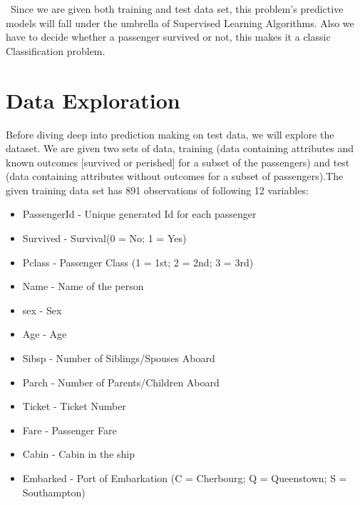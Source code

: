 \documentclass[a4paper,10pt]{report}\usepackage[]{graphicx}\usepackage[]{color}
\begin{document}
\ Since we are given both training and test data set, this problem's predictive models will fall under the umbrella of Supervised Learning Algorithms. Also we have to decide whether a passenger survived or not, this makes it a classic Classification problem.

\section{Data Exploration}
Before diving deep into prediction making on test data, we will explore the dataset. We are given two sets of data, training (data containing attributes and known outcomes [survived or perished] for a subset of the passengers) and test (data containing attributes without outcomes for a subset of passengers).The given training data set has 891 observations of following 12 variables:
\begin{itemize}
  \item PassengerId - Unique generated Id for each passenger
  \item Survived - Survival(0 = No; 1 = Yes)
  \item Pclass - Passenger Class (1 = 1st; 2 = 2nd; 3 = 3rd)
  \item Name - Name of the person
  \item sex - Sex 
  \item Age - Age
  \item Sibsp - Number of Siblings/Spouses Aboard
  \item Parch - Number of Parents/Children Aboard
  \item Ticket - Ticket Number
  \item Fare - Passenger Fare
  \item Cabin - Cabin in the ship
  \item Embarked - Port of Embarkation (C = Cherbourg; Q = Queenstown; S = Southampton)
  
\end{itemize}
\end{document}
